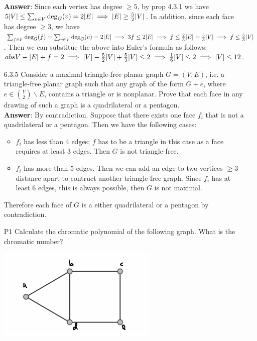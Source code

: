 \documentclass{article}
\begin{document}
\begin{itemize}
            \textbf{Answer}: Since each vertex has degree $\geq 5$, by prop 4.3.1 we have $5\abs{V}\leq\sum_{v\in V}\deg_G(v)=2\abs{E}\implies\abs{E}\geq\frac{5}{2}\abs{V}$. In addition, since each face has degree $\geq 3$, we have $\sum_{f\in F}\deg_G(f)=\sum_{v\in V}\deg_G(v)=2\abs{E}\implies 3f\leq 2\abs{E}\implies f\leq\frac{2}{3}\abs{E}=\frac{5}{3}\abs{V}\implies f\leq\frac{5}{3}\abs{V}$. Then we can substitue the above into Euler's formula as follows: $abs{V}-\abs{E}+f=2\implies\abs{V}-\frac{5}{2}\abs{V}+\frac{5}{3}\abs{V}\leq 2\implies\frac{1}{6}\abs{V}\leq 2\implies\abs{V}\leq 12$.
      \item [6.3.5] Consider a maximal triangle-free planar graph $G=(V,E)$, i.e. a triangle-free planar graph such that any graph of the form $G+e$, where $e\in\binom{V}{2}\backslash E$, contains a triangle or is nonplanar. Prove that each face in any drawing of such a graph is a quadrilateral or a pentagon.\\
            \textbf{Answer}: By contradiction. Suppose that there exists one face $f_i$ that is not a quadrilateral or a pentagon. Then we have the following cases:
            \begin{itemize}
                  \item $f_i$ has less than 4 edges; $f$ has to be a triangle in this case as a face requires at least 3 edges. Then $G$ is not triangle-free.
                  \item $f_i$ has more than 5 edges. Then we can add an edge to two vertices $\geq 3$ distance apart to contruct another triangle-free graph. Since $f_i$ has at least 6 edges, this is always possible, then $G$ is not maximal.
            \end{itemize}
            Therefore each face of $G$ is a either quadrilateral or a pentagon by contradiction.
      \item [P1] Calculate the chromatic polynomial of the following graph. What is the chromatic number?
            \begin{center}
                  \includegraphics[width=3in]{p1.png}
            \end{center}

\end{itemize}
\end{document}
